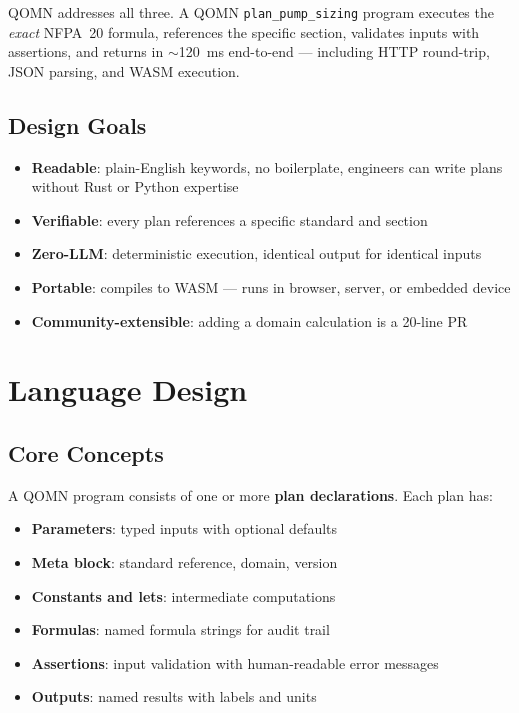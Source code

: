 \documentclass[12pt,a4paper]{article}
\begin{document}
QOMN addresses all three. A QOMN \texttt{plan\_pump\_sizing} program
executes the \emph{exact} NFPA~20 formula, references the specific section,
validates inputs with assertions, and returns in $\sim$120~ms end-to-end —
including HTTP round-trip, JSON parsing, and WASM execution.

\subsection{Design Goals}

\begin{itemize}
  \item \textbf{Readable}: plain-English keywords, no boilerplate, engineers can
    write plans without Rust or Python expertise
  \item \textbf{Verifiable}: every plan references a specific standard and section
  \item \textbf{Zero-LLM}: deterministic execution, identical output for identical
    inputs
  \item \textbf{Portable}: compiles to WASM — runs in browser, server, or
    embedded device
  \item \textbf{Community-extensible}: adding a domain calculation is a 20-line PR
\end{itemize}

\section{Language Design}

\subsection{Core Concepts}

A QOMN program consists of one or more \textbf{plan declarations}.
Each plan has:

\begin{itemize}
  \item \textbf{Parameters}: typed inputs with optional defaults
  \item \textbf{Meta block}: standard reference, domain, version
  \item \textbf{Constants and lets}: intermediate computations
  \item \textbf{Formulas}: named formula strings for audit trail
  \item \textbf{Assertions}: input validation with human-readable error messages
  \item \textbf{Outputs}: named results with labels and units
\end{itemize}
\end{document}
